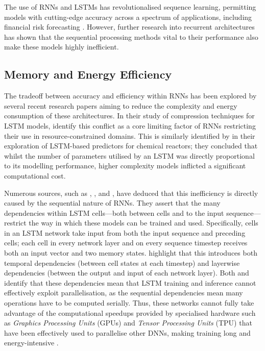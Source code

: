 \documentclass[a4paper, 11pt]{report}
\begin{document}
    The use of RNNs and LSTMs has revolutionalised sequence learning, permitting models with cutting-edge accuracy across a spectrum of applications, including financial risk forecasting \citep{du-2019}. However, further research into recurrent architectures has shown that the sequential processing methods vital to their performance also make these models highly inefficient.


    \subsection{Memory and Energy Efficiency}

    The tradeoff between accuracy and efficiency within RNNs has been explored by several recent research papers aiming to reduce the complexity and energy consumption of these architectures. In their study of compression techniques for LSTM models, \citet{wang-2018} identify this conflict as a core limiting factor of RNNs restricting their use in resource-constrained domains. This is similarly identified by \citet{zarzycki-2021} in their exploration of LSTM-based predictors for chemical reactors; they concluded that whilst the number of parameters utilised by an LSTM was directly proportional to its modelling performance, higher complexity models inflicted a significant computational cost. 

    Numerous sources, such as \citet{cao-2017}, \citet{feliz-2021}, and \citet{zhang-2021}, have deduced that this inefficiency is directly caused by the sequential nature of RNNs. They assert that the many dependencies within LSTM cells---both between cells and to the input sequence---restrict the way in which these models can be trained and used. Specifically, cells in an LSTM network take input from both the input sequence and preceding cells; each cell in every network layer and on every sequence timestep receives both an input vector and two memory states. \citet{cao-2017} highlight that this introduces both temporal dependencies (between cell states at each timestep) and layerwise dependencies (between the output and input of each network layer). Both \citet{cao-2017} and \citet{feliz-2021} identify that these dependencies mean that LSTM training and inference cannot effectively exploit parallelisation, as the sequential dependencies mean many operations have to be computed serially. Thus, these networks cannot fully take advantage of the computational speedups provided by specialised hardware such as \emph{Graphics Processing Units} (GPUs) and \emph{Tensor Processing Units} (TPU) that have been effectively used to parallelise other DNNs, making training long and energy-intensive \citep{zhang-2021b}.
\end{document}
